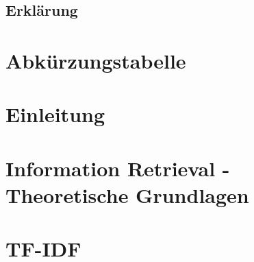 \documentclass[12pt, a4paper]{scrreprt}
\newcommand\blankpage{%
		\null
		\thispagestyle{empty}%
		\addtocounter{page}{-1}%
		\newpage}
\begin{document}
	
	
	\thispagestyle{empty}
	\section*{Erklärung}
	
	\thispagestyle{empty}
	\newpage
	\begin{abstract}
		
	\end{abstract}
	\afterpage{\blankpage}
	\tableofcontents
	\thispagestyle{empty}
	\listoffigures
	\thispagestyle{empty}
	\chapter*{Abkürzungstabelle}
	\label{abkürzung}
	
	\thispagestyle{empty}
	\begin{spacing}{1.5}	
		\chapter{Einleitung}
		\label{einleitung}
		
		\chapter{Information Retrieval - Theoretische Grundlagen}
		\label{grundlagen}
		
		\chapter{TF-IDF}
		\label{tfidf}
		
	\end{spacing}
	\pagestyle{plain}
	\printbibliography
\end{document}
